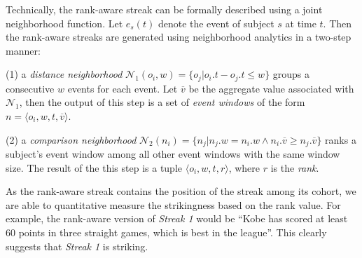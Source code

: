 %
% 

Technically, the rank-aware streak can be formally described using a joint neighborhood function. 
Let $e_s(t)$ denote the event of subject $s$ at time $t$. Then the rank-aware streaks are generated using neighborhood analytics in a two-step manner: 

(1) a \emph{distance neighborhood} $\mathcal{N}_1(o_i,w)=\{o_j | o_i.t - o_j.t \leq w \}$ groups a consecutive $w$ events for each event. Let $\overline{v}$ be the aggregate value associated with $\mathcal{N}_1$, then the output of this step is a set of \emph{event windows} of the form  $n=\langle o_i, w, t, \overline{v} \rangle$.

(2) a \emph{comparison neighborhood} $\mathcal{N}_2(n_i) = \{n_j | n_j.w = n_i.w \wedge n_i.\overline{v} \geq n_j.\overline{v} \}$ ranks a subject's event window among all other event windows with the same window size. The result of the this step is a tuple $\langle o_i, w, t, r \rangle$, where $r$ is the \emph{rank}.
%

As the rank-aware streak contains the position of the streak among its cohort, we are able to
quantitative measure the strikingness based on the rank value. 
For example, the rank-aware
version of \emph{Streak 1} would be ``Kobe has scored at least 60 points in three straight games, which is best in the league''.  This clearly suggests that \emph{Streak 1} is striking.
%

